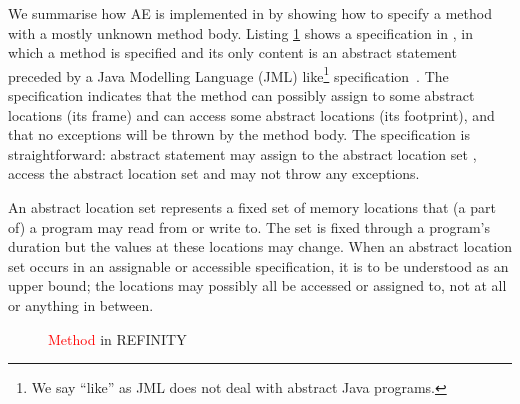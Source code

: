 We summarise how AE is implemented in \Refinity{} by showing how to specify a method  with a mostly unknown method body.
Listing \ref{lst:ExtractVariable-refinity-method} shows a specification in \Refinity{}, in which a method  is specified and its only content is an abstract statement  preceded by a Java Modelling Language (JML) like\footnote{We say ``like'' as JML does not deal with abstract Java programs.} specification~\cite{HuismanAhrendtBruns2014_1000041881}.
%
The specification indicates that the method can possibly assign to some abstract locations (its frame) and can access some abstract locations (its footprint), and that no exceptions will be thrown by the method body.
The specification is straightforward: abstract statement  may assign to the abstract location set , access the abstract location set  and may not throw any exceptions.

An abstract location set represents a fixed set of memory locations that (a part of) a program may read from or write to.
The set is fixed through a program's duration but the values at these locations may change.
When an abstract location set occurs in an assignable or accessible specification, it is to be understood as an upper bound;
the locations may possibly all be accessed or assigned to, not at all or anything in between.

\begin{figure}[tbp]
  \centering
  \captionsetup{type=lstlisting}
  \begin{sublstlisting}{.65\linewidth}
  
  \end{sublstlisting}
  \caption{\textcolor{red}{Method} in REFINITY}
  \label{lst:ExtractVariable-refinity-method}
\end{figure}


